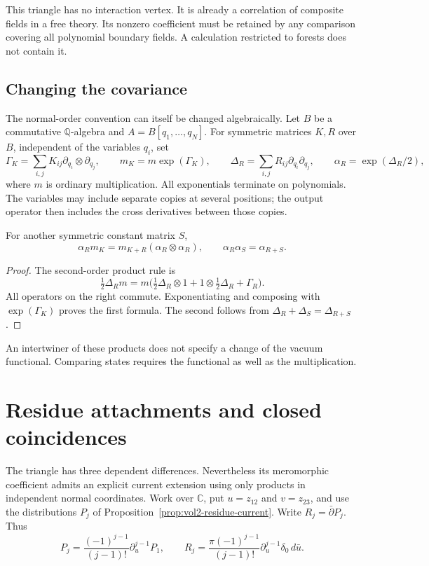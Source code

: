 This triangle has no interaction vertex. It is already a correlation
of composite fields in a free theory. Its nonzero coefficient must be
retained by any comparison covering all polynomial boundary fields.
A calculation restricted to forests does not contain it.

\subsection{Changing the covariance}

The normal-order convention can itself be changed algebraically.
Let $B$ be a commutative $\mathbb Q$-algebra and
$A=B[q_1,\ldots,q_N]$. For symmetric matrices $K,R$ over $B$,
independent of the variables $q_i$, set
\[
 \Gamma_K=\sum_{i,j}K_{ij}\partial_{q_i}\otimes\partial_{q_j},
 \qquad m_K=m\exp(\Gamma_K),\qquad
 \Delta_R=\sum_{i,j}R_{ij}\partial_{q_i}\partial_{q_j},
 \qquad \alpha_R=\exp(\Delta_R/2),
\]
where $m$ is ordinary multiplication. All exponentials terminate on
polynomials. The variables may include separate copies at several
positions; the output operator then includes the cross derivatives
between those copies.

\begin{proposition}\label{prop:vol2-covariance-intertwiner}
For another symmetric constant matrix $S$,
\[
 \alpha_Rm_K=m_{K+R}(\alpha_R\otimes\alpha_R),
 \qquad \alpha_R\alpha_S=\alpha_{R+S}.
\]
\end{proposition}

\begin{proof}
The second-order product rule is
\[
 \tfrac12\Delta_Rm
 =m\bigl(\tfrac12\Delta_R\otimes1+
          1\otimes\tfrac12\Delta_R+\Gamma_R\bigr).
\]
All operators on the right commute. Exponentiating and composing
with $\exp(\Gamma_K)$ proves the first formula. The second follows
from $\Delta_R+\Delta_S=\Delta_{R+S}$.
\end{proof}

An intertwiner of these products does not specify a change of the
vacuum functional. Comparing states requires the functional as well
as the multiplication.

\section{Residue attachments and closed coincidences}
\label{sec:vol2-triangle-attachments}

The triangle has three dependent differences. Nevertheless its
meromorphic coefficient admits an explicit current extension using
only products in independent normal coordinates.
Work over $\mathbb C$, put $u=z_{12}$ and $v=z_{23}$, and use
the distributions $P_j$ of Proposition~\ref{prop:vol2-residue-current}.
Write $R_j=\bar\partial P_j$. Thus
\[
 P_j=\frac{(-1)^{j-1}}{(j-1)!}\partial_u^{j-1}P_1,
 \qquad
 R_j=\frac{\pi(-1)^{j-1}}{(j-1)!}
              \partial_u^{j-1}\delta_0\,d\bar u.
\]


